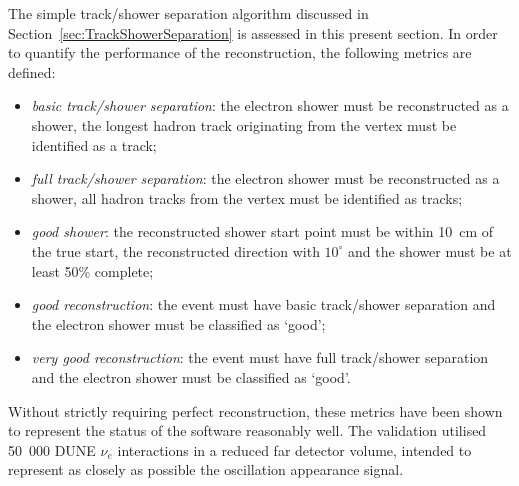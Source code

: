 The simple track/shower separation algorithm discussed in Section~\ref{sec:TrackShowerSeparation} is assessed in this present section.  In order to quantify the performance of the reconstruction, the following metrics are defined:
\begin{itemize}
  \item \textit{basic track/shower separation}: the electron shower must be reconstructed as a shower, the longest hadron track originating from the vertex must be identified as a track;
  \item \textit{full track/shower separation}: the electron shower must be reconstructed as a shower, all hadron tracks from the vertex must be identified as tracks;
  \item \textit{good shower}: the reconstructed shower start point must be within 10~cm of the true start, the reconstructed direction with $10^{\circ}$ and the shower must be at least 50\% complete;
  \item \textit{good reconstruction}: the event must have basic track/shower separation and the electron shower must be classified as `good';
  \item \textit{very good reconstruction}: the event must have full track/shower separation and the electron shower must be classified as `good'.
\end{itemize}
Without strictly requiring perfect reconstruction, these metrics have been shown to represent the status of the software reasonably well.  The validation utilised 50~000 DUNE $\nu_e$ interactions in a reduced far detector volume, intended to represent as closely as possible the oscillation appearance signal.


